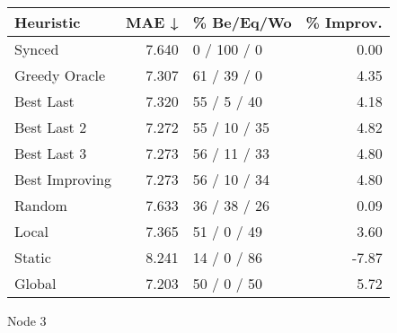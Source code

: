 \begin{tabular}{lrlr}
\toprule
\textbf{Heuristic} & \textbf{MAE ↓} & \textbf{\% Be/Eq/Wo} & \textbf{\% Improv.} \\
\midrule
            Synced &          7.640 &          0 / 100 / 0 &                0.00 \\
     Greedy Oracle &          7.307 &          61 / 39 / 0 &                4.35 \\
         Best Last &          7.320 &          55 / 5 / 40 &                4.18 \\
       Best Last 2 &          7.272 &         55 / 10 / 35 &                4.82 \\
       Best Last 3 &          7.273 &         56 / 11 / 33 &                4.80 \\
    Best Improving &          7.273 &         56 / 10 / 34 &                4.80 \\
            Random &          7.633 &         36 / 38 / 26 &                0.09 \\
             Local &          7.365 &          51 / 0 / 49 &                3.60 \\
            Static &          8.241 &          14 / 0 / 86 &               -7.87 \\
            Global &          7.203 &          50 / 0 / 50 &                5.72 \\
\bottomrule
\end{tabular}
\caption{Node 3}
\label{tab:ds_non_lr01_le1_bs2_3}
